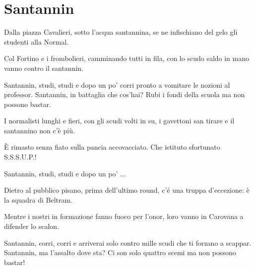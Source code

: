 \section{Santannin}
\begin{canzone}
Dalla piazza Cavalieri,
sotto l'acqua santannina,
se ne infischiano del gelo
gli studenti alla Normal.

Col Fortino e i frombolieri,
camminando tutti in fila,
con lo scudo saldo in mano
vanno contro il santannin.

Santannin,
studi, studi e dopo un po'
corri pronto a vomitare
le nozioni al professor.
Santannin,
in battaglia che cos'hai?
Rubi i fondi della scuola
ma non possono bastar.

\clearpage
I normalisti lunghi e fieri,
con gli scudi volti in su,
i gavettoni san tirare
e il santannino non c'è più.

È rimasto senza fiato
sulla pancia accovacciato.
Che istituto sfortunato
S.S.S.U.P.!

Santannin,
studi, studi e dopo un po'
...

Dietro al pubblico pisano,
prima dell'ultimo round,
c'é una truppa d'eccezione:
è la squadra di Beltram.

Mentre i nostri in formazione
fanno fuoco per l'onor,
loro vanno in Carovana
a difender lo scalon.

Santannin,
corri, corri e arriverai
solo contro mille scudi
che ti forzano a scappar.
Santannin,
ma l'assalto dove sta?
Ci son solo quattro scemi
ma non possono bastar!
\end{canzone}
